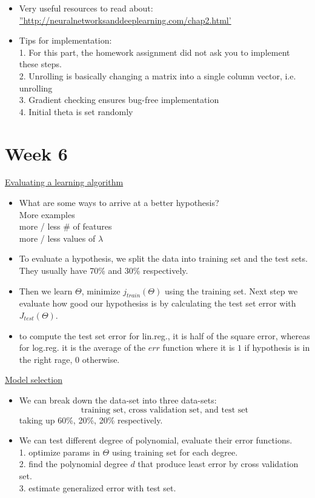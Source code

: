 \documentclass[12pt]{article}
\begin{document}
\begin{itemize}
\begin{itemize}
		\item Very useful resources to read about:\\
		\hyperref[http://neuralnetworksanddeeplearning.com/chap2.html]{''http://neuralnetworksanddeeplearning.com/chap2.html'}
		\item Tips for implementation:\\
		1. For this part, the homework assignment did not ask you to implement these steps.\\
		2. Unrolling is basically changing a matrix into a single column vector, i.e. unrolling\\
		3. Gradient checking ensures bug-free implementation\\
		4. Initial theta is set randomly
		
	\end{itemize}
		
	\end{itemize}

\newpage
\section*{Week 6}

\underline{Evaluating a learning algorithm}
\begin{itemize}
	\item What are some ways to arrive at a better hypothesis?\\
	More examples\\
	more / less \# of features\\
	more / less values of $\lambda$
	\item To evaluate a hypothesis, we split the data into training set and the test sets. They usually have 70\% and 30\% respectively.
	\item Then we learn $\Theta$, minimize $j_{train}(\Theta)$ using the training set. Next step we evaluate how good our hypothesiss is by calculating the test set error with $J_{test}(\Theta)$.
	\item to compute the test set error for lin.reg., it is half of the square error, whereas for log.reg. it is the average of  the $err$ function where it is $1$ if hypothesis is in the right rage, $0$ otherwise.
	
\end{itemize}

\underline{Model selection}

\begin{itemize}
	\item We can break down the data-set into three data-sets:
	\[\text{training set, cross validation set, and test set} \] taking up 60\%, 20\%, 20\% respectively.
	\item We can test different degree of polynomial, evaluate their error functions.\\
	1. optimize params in $\Theta$ using training set for each degree.\\
	2. find the polynomial degree $d$ that produce least error by cross validation set.\\
	3. estimate generalized error with test set.
	
\end{itemize}
\end{document}

